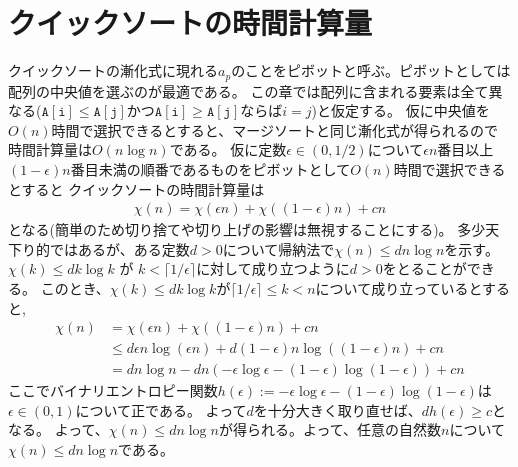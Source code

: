 \documentclass[a4paper,twoside,onecolumn,openany,article,10pt]{memoir}
\theoremstyle{remark}
\begin{document}
\section{クイックソートの時間計算量}
クイックソートの漸化式に現れる$a_p$のことをピボットと呼ぶ。ピボットとしては配列の中央値を選ぶのが最適である。
この章では配列に含まれる要素は全て異なる($\mathtt{A[i]\le A[j]}$かつ$\mathtt{A[i]\ge A[j]}$ならば$i = j$)と仮定する。
仮に中央値を$O(n)$時間で選択できるとすると、マージソートと同じ漸化式が得られるので時間計算量は$O(n\log n)$である。
仮に定数$\epsilon\in(0,1/2)$について$\epsilon n$番目以上$(1-\epsilon) n$番目未満の順番であるものをピボットとして$O(n)$時間で選択できるとすると
クイックソートの時間計算量は
\begin{align*}
\chi(n) = \chi(\epsilon n) + \chi((1-\epsilon)n) + cn
\end{align*}
となる(簡単のため切り捨てや切り上げの影響は無視することにする)。
多少天下り的ではあるが、ある定数$d>0$について帰納法で$\chi(n)\le dn\log n$を示す。
$\chi(k)\le dk\log k$ が $k< \lceil 1/\epsilon\rceil$に対して成り立つように$d>0$をとることができる。
このとき、$\chi(k)\le dk\log k$が$\lceil 1/\epsilon\rceil\le k<n$について成り立っているとすると,
\begin{align*}
\chi(n) &= \chi(\epsilon n) + \chi((1-\epsilon)n) + cn\\
&\le d\epsilon n\log(\epsilon n) + d(1-\epsilon)n\log((1-\epsilon)n) + cn\\
&= d n\log n - dn \left(-\epsilon \log\epsilon - (1-\epsilon)\log(1-\epsilon)\right) + c n
\end{align*}
ここでバイナリエントロピー関数$h(\epsilon):=-\epsilon\log\epsilon-(1-\epsilon)\log(1-\epsilon)$は$\epsilon\in(0,1)$について正である。
よって$d$を十分大きく取り直せば、$dh(\epsilon) \ge c$となる。
よって、$\chi(n)\le d n\log n$が得られる。よって、任意の自然数$n$について$\chi(n)\le dn\log n$である。
\end{document}
